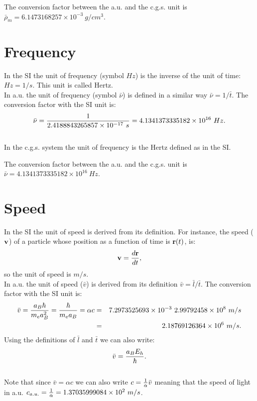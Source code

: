 \documentclass[12pt,a4paper]{article}
\def\cspeed{2.99792458\times 10^{8}}
\def\alphaf{7.2973525693\times 10^{-3}}
\def\bart{2.4188843265857\times 10^{-17}}
\def\barnu{4.1341373335182\times 10^{16}}
\def\barv{2.18769126364\times 10^{6}}
\def\barrhomcgs{6.1473168257\times 10^{-3}}
\def\cspeedau{1.37035999084\times 10^{2}}
\begin{document}
{\color{green} The conversion factor between the a.u. and the c.g.s. unit is
$\bar \rho_m=\barrhomcgs\ g/cm^3$.
}

\newpage
\section{\color{coral}Frequency}

In the SI the unit of frequency (symbol $Hz$) is the inverse
of the unit of time: $Hz=1/s$. This unit is called Hertz.
\\

{\color{web-blue} In a.u. the unit of frequency (symbol $\bar \nu$) is defined
in a similar way $\bar \nu= 1/\bar t$. The conversion factor with the 
SI unit is:
\begin{equation}
\bar \nu = {1 \over \bart\ s}=\barnu\ Hz.
\end{equation}
}
\\

{\color{orange} In the c.g.s. system the unit of frequency is the Hertz 
defined as in the SI.
\\
}

{\color{green} The conversion factor between the a.u. and the c.g.s. unit is
$\bar \nu=\barnu\ Hz$.
\\
}


\newpage
\section{\color{coral}Speed}
In the SI the unit of speed is derived from its definition.
For instance, the speed (${\bf v}$) of a particle 
whose position as a function of time is ${\bf r}(t)$, is:
\begin{equation}
{\bf v}={d{\bf r} \over dt},
\end{equation} 
so the unit of speed is $m/s$.
\\

{\color{web-blue} In a.u. the unit of speed ($\bar v$) is derived 
from its definition $\bar v = \bar l / \bar t$. The conversion factor
with the SI unit is:
\begin{eqnarray}
\bar v ={a_B \hbar \over m_e a_B^2}={\hbar \over m_e a_B}=\alpha c&=&
 {\alphaf\  \cspeed\ m/s}\nonumber \\ 
&=&\barv\ m/s.
\end{eqnarray}
Using the definitions of $\bar l$ and $\bar t$ we can also write:
\begin{equation}
\bar v={a_B E_h \over \hbar}.
\end{equation}
\\
Note that since $\bar v= \alpha c$ we can also write 
$c={1\over \alpha} \bar v$ meaning that the speed of light in a.u. 
$c_{a.u.}={1\over\alpha}=\cspeedau\ m/s$.
}
\\
\end{document}
